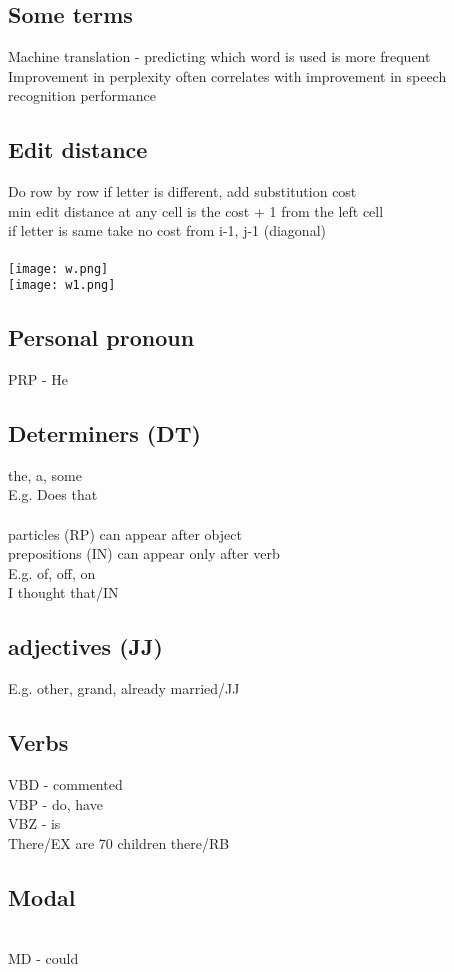 \documentclass[11pt]{article}
\begin{document}
\setlength{\columnsep}{1cm}
\begin{multicols*}{3}
\subsection*{Some terms}
Machine translation - predicting which word is used is more frequent \\
 Improvement in perplexity often correlates with improvement in speech recognition performance
\subsection*{Edit distance}
Do row by row
if letter is different, add substitution cost\\
min edit distance at any cell is the cost + 1 from the left cell \\
if letter is same take no cost from i-1, j-1 (diagonal)
\\\\
\texttt{[image: w.png]}
\\
\texttt{[image: w1.png]}
\subsection{Personal pronoun}
PRP - He
\subsection*{Determiners (DT)}
the, a, some\\
E.g. Does that\\\\
particles (RP) can appear after object\\
prepositions (IN) can appear only after verb \\
E.g. of, off, on\\
I thought that/IN
\subsection*{adjectives (JJ)} 
E.g. other, grand, already married/JJ
\subsection*{Verbs}
VBD - commented\\
VBP - do, have\\
VBZ - is\\
There/EX are 70 children there/RB
\subsection*{Modal}\\
MD - could\\

\end{multicols*}
\end{document}
